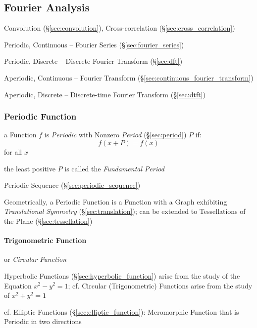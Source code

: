 \subsection{Fourier Analysis}\label{sec:fourier_analysis}

\fist Convolution (\S\ref{sec:convolution}), Cross-correlation
(\S\ref{sec:cross_correlation})

Periodic, Continuous -- Fourier Series (\S\ref{sec:fourier_series})

Periodic, Discrete -- Discrete Fourier Transform (\S\ref{sec:dft})

Aperiodic, Continuous -- Fourier Transform
  (\S\ref{sec:continuous_fourier_transform})

Aperiodic, Discrete -- Discrete-time Fourier Transform (\S\ref{sec:dtft})



\subsubsection{Periodic Function}\label{sec:periodic_function}

a Function $f$ is \emph{Periodic} with Nonzero \emph{Period}
(\S\ref{sec:period}) $P$ if:
\[
  f(x+P) = f(x)
\]
for all $x$

the least positive $P$ is called the \emph{Fundamental Period}

\fist Periodic Sequence (\S\ref{sec:periodic_sequence})

Geometrically, a Periodic Function is a Function with a Graph exhibiting
\emph{Translational Symmetry} (\S\ref{sec:translation});
can be extended to Tessellations of the Plane (\S\ref{sec:tessellation})



\paragraph{Trigonometric Function}\label{sec:trigonometric_function}\hfill

or \emph{Circular Function}

Hyperbolic Functions (\S\ref{sec:hyperbolic_function}) arise from the study of
the Equation $x^2 - y^2 = 1$; cf. Circular (Trigonometric) Functions arise from
the study of $x^2 + y^2 = 1$

cf. Elliptic Functions (\S\ref{sec:elliptic_function}): Meromorphic Function
that is Periodic in two directions

